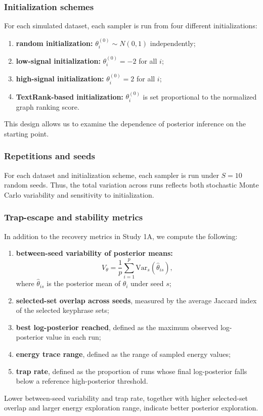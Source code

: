 \documentclass[11pt]{article}
\begin{document}
\subsubsection{Initialization schemes}

For each simulated dataset, each sampler is run from four different initializations:
\begin{enumerate}
    \item \textbf{random initialization:} $\theta_i^{(0)} \sim N(0,1)$ independently;
    \item \textbf{low-signal initialization:} $\theta_i^{(0)}=-2$ for all $i$;
    \item \textbf{high-signal initialization:} $\theta_i^{(0)}=2$ for all $i$;
    \item \textbf{TextRank-based initialization:} $\theta_i^{(0)}$ is set proportional to the normalized graph ranking score.
\end{enumerate}
This design allows us to examine the dependence of posterior inference on the starting point.

\subsubsection{Repetitions and seeds}

For each dataset and initialization scheme, each sampler is run under $S=10$ random seeds. Thus, the total variation across runs reflects both stochastic Monte Carlo variability and sensitivity to initialization.

\subsubsection{Trap-escape and stability metrics}

In addition to the recovery metrics in Study 1A, we compute the following:
\begin{enumerate}
    \item \textbf{between-seed variability of posterior means:}
    \[
    V_{\theta}
    =
    \frac{1}{p}\sum_{i=1}^p \mathrm{Var}_s(\hat{\theta}_{is}),
    \]
    where $\hat{\theta}_{is}$ is the posterior mean of $\theta_i$ under seed $s$;
    \item \textbf{selected-set overlap across seeds}, measured by the average Jaccard index of the selected keyphrase sets;
    \item \textbf{best log-posterior reached}, defined as the maximum observed log-posterior value in each run;
    \item \textbf{energy trace range}, defined as the range of sampled energy values;
    \item \textbf{trap rate}, defined as the proportion of runs whose final log-posterior falls below a reference high-posterior threshold.
\end{enumerate}
Lower between-seed variability and trap rate, together with higher selected-set overlap and larger energy exploration range, indicate better posterior exploration.
\end{document}
